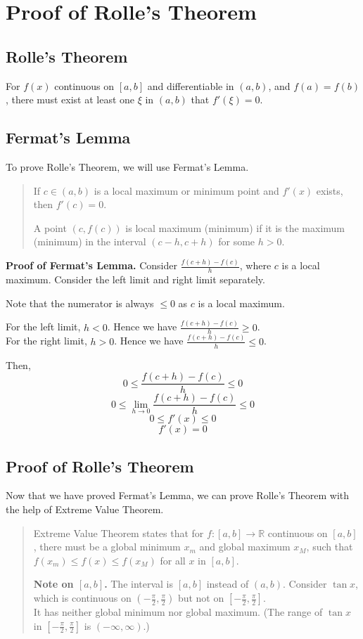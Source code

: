 \section{Proof of Rolle's Theorem}

\subsection{Rolle's Theorem}

For $f(x)$ continuous on $[a, b]$ and differentiable in $(a, b)$, and $f(a) = f(b)$, there must exist at least one $\xi$ in $(a, b)$ that $f'(\xi) = 0$.

\subsection{Fermat's Lemma}

To prove Rolle's Theorem, we will use Fermat's Lemma.

\begin{quote}
    If $c \in (a, b)$ is a local maximum or minimum point and $f'(x)$ exists, then $f'(c) = 0$.
    
    A point $(c, f(c))$ is local maximum (minimum) if it is the maximum (minimum) in the interval $(c - h, c + h)$ for some $h > 0$.
\end{quote}

\textbf{Proof of Fermat's Lemma.}
Consider $\frac{f(c + h) - f(c)}{h}$, where $c$ is a local maximum. Consider the left limit and right limit separately.

Note that the numerator is always $\leq 0$ as $c$ is a local maximum.

For the left limit, $h < 0$. Hence we have $\frac{f(c + h) - f(c)}{h} \geq 0$.\\
For the right limit, $h > 0$. Hence we have $\frac{f(c + h) - f(c)}{h} \leq 0$.

Then, $$ 0 \leq \frac{f(c + h) - f(c)}{h} \leq 0 $$
$$ 0 \leq \lim_{h \to 0} \frac{f(c + h) - f(c)}{h} \leq 0 $$
$$ 0 \leq f'(x) \leq 0 $$
$$ f'(x) = 0 $$

\subsection{Proof of Rolle's Theorem}

Now that we have proved Fermat's Lemma, we can prove Rolle's Theorem with the help of Extreme Value Theorem.

\begin{quote}
    Extreme Value Theorem states that for $f: [a, b] \to \mathbb{R}$ continuous on $[a, b]$, there must be a global minimum $x_m$ and global maximum $x_M$, such that $f(x_m) \leq f(x) \leq f(x_M)$ for all $x$ in $[a, b]$.
    
    \textbf{Note on $[a, b]$.} The interval is $[a, b]$ instead of $(a, b)$. Consider $\tan x$, which is continuous on $(-\frac{\pi}{2}, \frac{\pi}{2})$ but not on $[-\frac{\pi}{2}, \frac{\pi}{2}]$.\\
    It has neither global minimum nor global maximum. (The range of $\tan x$ in $[-\frac{\pi}{2}, \frac{\pi}{2}]$ is $(-\infty, \infty)$.)
\end{quote}

